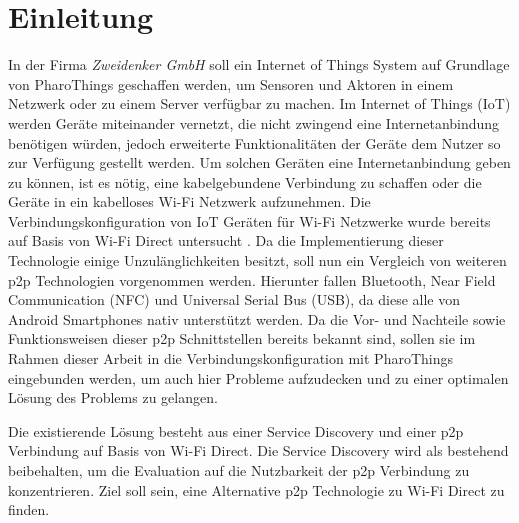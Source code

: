 \section{Einleitung}
        In der Firma {\it Zweidenker GmbH} soll ein Internet of Things System auf Grundlage von PharoThings \cite{pharoThings} geschaffen werden, um Sensoren und Aktoren in einem Netzwerk oder zu einem Server verfügbar zu machen.
        Im Internet of Things (IoT) werden Geräte miteinander vernetzt, die nicht zwingend eine Internetanbindung benötigen würden, jedoch erweiterte Funktionalitäten der Geräte dem Nutzer so zur Verfügung gestellt werden. Um solchen Geräten eine Internetanbindung geben zu können, ist es nötig, eine kabelgebundene Verbindung zu schaffen oder die Geräte in ein kabelloses Wi-Fi Netzwerk aufzunehmen. Die Verbindungskonfiguration von IoT Geräten für Wi-Fi Netzwerke wurde bereits auf Basis von Wi-Fi Direct untersucht \cite{aiProject}. Da die Implementierung dieser Technologie einige Unzulänglichkeiten besitzt, soll nun ein Vergleich von weiteren p2p Technologien \linebreak vorgenommen werden. Hierunter fallen Bluetooth, Near Field Communication (NFC) und Universal Serial Bus (USB), da diese alle von Android Smartphones nativ unterstützt werden. Da die Vor- und Nachteile sowie Funktionsweisen dieser p2p Schnittstellen bereits bekannt sind, sollen sie im Rahmen dieser Arbeit in die \linebreak Verbindungskonfiguration mit PharoThings eingebunden werden, um auch hier Probleme aufzudecken und zu einer optimalen Lösung des Problems zu gelangen.
        
        Die existierende Lösung besteht aus einer Service Discovery und einer p2p \linebreak Verbindung auf Basis von Wi-Fi Direct. Die Service Discovery wird als bestehend beibehalten, um die Evaluation auf die Nutzbarkeit der p2p Verbindung zu konzentrieren. Ziel soll sein, eine Alternative p2p Technologie zu Wi-Fi Direct zu finden.

